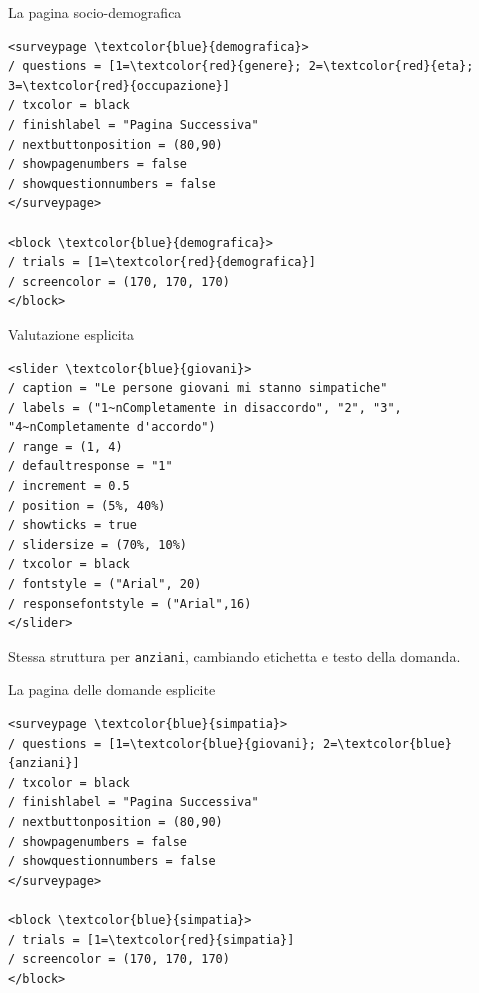 \documentclass[compress]{beamer}
\begin{document}
\begin{frame}[fragile]{La pagina socio-demografica}
\begin{small}
\begin{Verbatim}[commandchars=\\\{\}]
<surveypage \textcolor{blue}{demografica}>
/ questions = [1=\textcolor{red}{genere}; 2=\textcolor{red}{eta}; 3=\textcolor{red}{occupazione}]
/ txcolor = black
/ finishlabel = "Pagina Successiva"
/ nextbuttonposition = (80,90)
/ showpagenumbers = false
/ showquestionnumbers = false
</surveypage>

<block \textcolor{blue}{demografica}>
/ trials = [1=\textcolor{red}{demografica}]
/ screencolor = (170, 170, 170)
</block>
\end{Verbatim}
\end{small}
\end{frame}

\begin{frame}[fragile]{Valutazione esplicita}
\begin{footnotesize}
\begin{Verbatim}[commandchars=\\\{\}]
<slider \textcolor{blue}{giovani}>
/ caption = "Le persone giovani mi stanno simpatiche"
/ labels = ("1~nCompletamente in disaccordo", "2", "3", 
"4~nCompletamente d'accordo")
/ range = (1, 4)
/ defaultresponse = "1"
/ increment = 0.5
/ position = (5%, 40%)
/ showticks = true
/ slidersize = (70%, 10%)
/ txcolor = black
/ fontstyle = ("Arial", 20)
/ responsefontstyle = ("Arial",16)
</slider>
\end{Verbatim}
\end{footnotesize}

\vspace{2mm}
Stessa struttura per \texttt{anziani}, cambiando etichetta e testo della domanda.
\end{frame}

\begin{frame}[fragile]{La pagina delle domande esplicite}
\begin{small}
\begin{Verbatim}[commandchars=\\\{\}]
<surveypage \textcolor{blue}{simpatia}>
/ questions = [1=\textcolor{blue}{giovani}; 2=\textcolor{blue}{anziani}]
/ txcolor = black
/ finishlabel = "Pagina Successiva"
/ nextbuttonposition = (80,90)
/ showpagenumbers = false
/ showquestionnumbers = false
</surveypage>

<block \textcolor{blue}{simpatia}>
/ trials = [1=\textcolor{red}{simpatia}]
/ screencolor = (170, 170, 170)
</block>
\end{Verbatim}
\end{small}
\end{frame}
\end{document}
